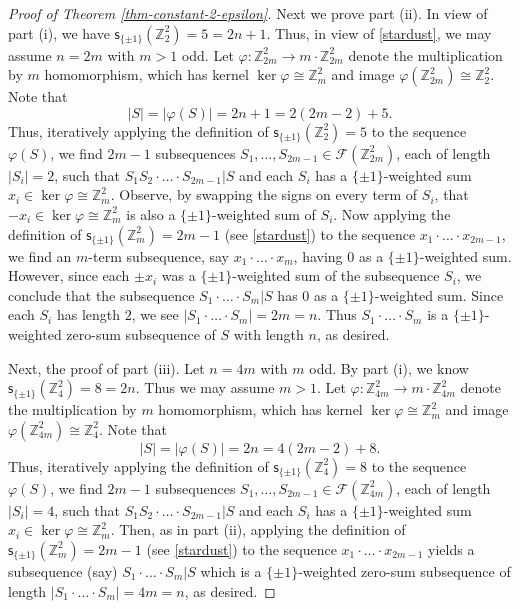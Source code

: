 \documentclass[11pt,reqno]{amsart}
\numberwithin{equation}{section}
\theoremstyle{definition}
\numberwithin{equation}{section}
\begin{document}
\begin{proof}[Proof of Theorem \ref{thm-constant-2-epsilon}]
Next we prove part (ii). In view of part (i), we have $\mathsf s_{\{\pm
 1\}}({\mathbb Z}_{2}^2)=5=2n+1$. Thus, in view of \eqref{stardust},  we
 may assume $n=2m$ with $m>1$ odd. Let $\varphi: {\mathbb Z}_{2m}^2\rightarrow m\cdot{\mathbb Z}_{2m}^2$
 denote the multiplication by $m$ homomorphism, which has kernel $\ker
\varphi\cong {\mathbb Z}_m^2$ and image $\varphi({\mathbb Z}_{2m}^2)\cong {\mathbb Z}_2^2$.
 Note that $$|S|=|\varphi(S)|=2n+1=2(2m-2)+5.$$ Thus, iteratively applying the
 definition of $\mathsf s_{\{\pm 1\}}({\mathbb Z}_{2}^2)=5$ to the
 sequence $\varphi(S)$, we find $2m-1$ subsequences
 $S_1,\ldots,S_{2m-1}\in {\mathcal F}({\mathbb Z}_{2m}^2)$, each of length $|S_i|=2$, such that
 $S_1S_2\cdot \ldots\cdot S_{2m-1}|S$ and each $S_i$ has a $\{\pm
 1\}$-weighted sum $x_i\in \ker \varphi\cong {\mathbb Z}_m^2$. Observe, by
 swapping the signs on every term of $S_i$, that $-x_i\in  \ker
 \varphi\cong {\mathbb Z}_m^2$ is also a $\{\pm 1\}$-weighted sum of
 $S_i$. Now applying the definition of $\mathsf s_{\{\pm 1\}}({\mathbb Z}_m^2)=2m-1$
 (see \eqref{stardust}) to the sequence $x_1\cdot \ldots\cdot
 x_{2m-1}$, we find an $m$-term subsequence, say $x_1\cdot\ldots \cdot
 x_m$, having $0$ as a $\{\pm 1\}$-weighted sum. However, since each $\pm
 x_i$ was a  $\{\pm 1\}$-weighted sum of the subsequence $S_i$, we
 conclude that the subsequence $S_1\cdot \ldots\cdot S_m|S$ has $0$ as a
 $\{\pm 1\}$-weighted sum. Since each $S_i$ has length $2$, we see
 $|S_1\cdot \ldots\cdot S_m|=2m=n$. Thus $S_1\cdot \ldots \cdot S_m$ is a
 $\{\pm 1\}$-weighted zero-sum subsequence of $S$ with length $n$, as desired.

 \bigskip

Next, the proof of part (iii). Let $n=4m$ with $m$ odd. By part (i), we know
 $\mathsf s_{\{\pm 1\}}({\mathbb Z}_4^2)=8=2n$. Thus we may assume $m>1$.
 Let $\varphi: {\mathbb Z}_{4m}^2\rightarrow m\cdot {\mathbb Z}_{4m}^2$ denote the multiplication by $m$
 homomorphism, which has kernel $\ker \varphi\cong {\mathbb Z}^2_m$ and
image $\varphi({\mathbb Z}_{4m}^2)\cong {\mathbb Z}_4^2$.
 Note that $$|S|=|\varphi(S)|=2n=4(2m-2)+8.$$ Thus, iteratively applying the
 definition of $\mathsf s_{\{\pm 1\}}({\mathbb Z}_{4}^2)=8$ to the
 sequence $\varphi(S)$, we find $2m-1$ subsequences
 $S_1,\ldots,S_{2m-1}\in {\mathcal F}({\mathbb Z}_{4m}^2)$, each of length $|S_i|=4$, such that
 $S_1S_2\cdot \ldots\cdot S_{2m-1}|S$ and each $S_i$ has a $\{\pm
 1\}$-weighted sum $x_i\in \ker \varphi\cong {\mathbb Z}^2_m$. Then, as in
 part (ii), applying the definition of $\mathsf s_{\{\pm 1\}}({\mathbb Z}_m^2)=2m-1$
 (see \eqref{stardust}) to the sequence $x_1\cdot \ldots\cdot
 x_{2m-1}$ yields a subsequence (say) $S_1\cdot \ldots\cdot S_m|S$ which
 is a $\{\pm 1\}$-weighted zero-sum subsequence of length
$|S_1\cdot\ldots\cdot S_m|=4m=n$, as desired.


\end{proof}
\end{document}
